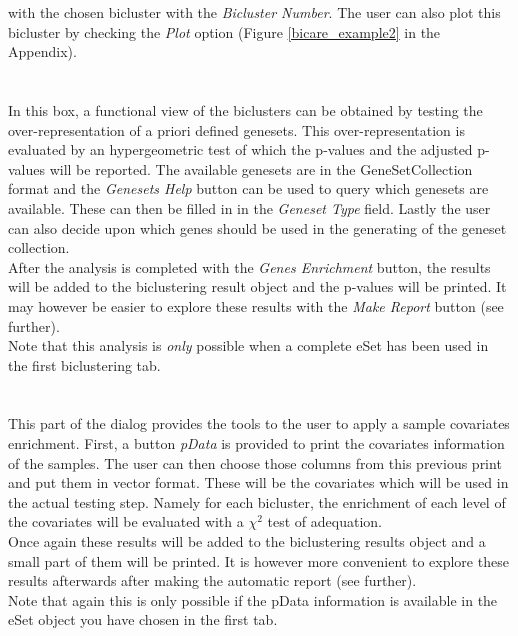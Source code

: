 \documentclass[a4paper]{article}\usepackage[]{graphicx}\usepackage[]{color}
\begin{document}
with the chosen bicluster with the {\it Bicluster Number}. The user can also plot this bicluster by
checking the {\it Plot} option (Figure \ref{bicare_example2} in the Appendix).
\\ \\
\\
In this box, a functional view of the biclusters can be obtained by testing the
over-representation of a priori defined genesets. This over-representation is
evaluated by an hypergeometric test of which the p-values and the adjusted
p-values will be reported. The available genesets are in the GeneSetCollection
format and the {\it Genesets Help} button can be used to query which genesets
are available. These can then be filled in in the {\it Geneset Type} field.
Lastly the user can also decide upon which genes should be used in the
generating of the geneset collection.\\ After the analysis is completed with the
{\it Genes Enrichment} button, the results will be added to the biclustering
result object and the p-values will be printed. It may however be easier to
explore these results with the {\it Make Report} button (see further).\\
Note that this analysis is {\it only} possible when a complete eSet has been
used in the first biclustering tab.
\\ \\
\\
This part of the dialog provides the tools to the user to apply a sample
covariates enrichment. First, a button {\it pData} is provided to print the
covariates information of the samples. The user can then choose those columns
from this previous print and put them in vector format. These will be the
covariates which will be used in the actual testing step. Namely for each bicluster, the
enrichment of each level of the covariates will be evaluated with a $\chi^2$
test of adequation.\\
Once again these results will be added to the biclustering results object and a
small part of them will be printed. It is however more convenient to explore
these results afterwards after making the automatic report (see further).\\
Note that again this is only possible if the pData information is available in
the eSet object you have chosen in the first tab.
\\ \\
\\
\end{document}
